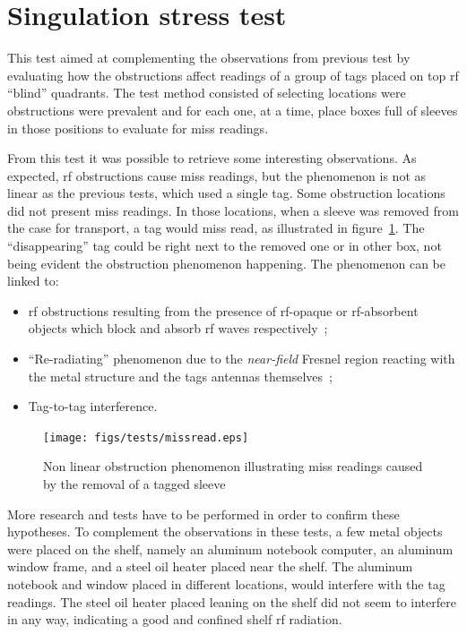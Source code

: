 \section{Singulation stress test}

This test aimed at complementing the observations from previous test by evaluating how the obstructions affect readings of a group of tags placed on top \ac{rf} ``blind'' quadrants.
The test method consisted of selecting locations were obstructions were prevalent and for each one, at a time, place boxes full of sleeves in those positions to evaluate for miss readings.

From this test it was possible to retrieve some interesting observations. 
As expected, \ac{rf} obstructions cause miss readings, but the phenomenon is not as linear as the previous tests, which used a single tag. 
Some obstruction locations did not present miss readings. In those locations, when a sleeve was removed from the case for transport, a tag would miss read, as illustrated in figure~\ref{fig:missreading}. The ``disappearing'' tag could be right next to the removed one or in other box, not being evident the obstruction phenomenon happening.
The phenomenon can be linked to:

\begin{itemize}
    \item \ac{rf} obstructions resulting from the presence of \ac{rf}-opaque or \ac{rf}-absorbent objects which block and absorb \ac{rf} waves respectively~\cite{lahiriRFIDSourcebook2005};
    \item ``Re-radiating'' phenomenon due to the \emph{near-field} Fresnel region reacting with the metal structure and the tags antennas themselves~\cite{ElectromagneticRadiationField};
    \item Tag-to-tag interference.
\end{itemize}

\begin{figure}
    \centering
    \texttt{[image: figs/tests/missread.eps]}
    \caption{Non linear obstruction phenomenon illustrating miss readings caused by the removal of a tagged sleeve}
    \label{fig:missreading}
\end{figure}

More research and tests have to be performed in order to confirm these hypotheses.
To complement the observations in these tests, a few metal objects were placed on the shelf, namely an aluminum notebook computer, an aluminum window frame, and a steel oil heater placed near the shelf.
The aluminum notebook and window placed in different locations, would interfere with the tag readings. The steel oil heater placed leaning on the shelf did not seem to interfere in any way, indicating a good and confined shelf \ac{rf} radiation.


